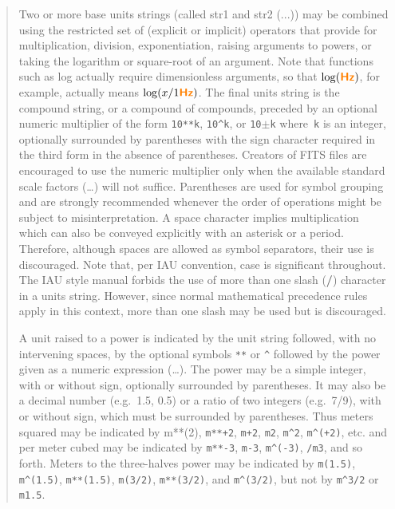 \documentclass[12pt,notitlepage,onecolumn]{ivoa}
\def\eg{e.g.~}
\newcommand{\unit}[1]{\textbf{\textsf{\color{orange}#1}}}
\begin{document}
\begin{quote}
Two or more base units strings (called str1 and str2 (...)) may be combined using
the restricted set of (explicit or implicit) operators that provide
for multiplication, division, exponentiation, raising arguments
to powers, or taking the logarithm or square-root of an
argument. Note that functions such as log actually require dimensionless
arguments, so that $\log(\unit{Hz})$, for example, actually
means $\log(x/1 \unit{Hz})$. The final units string is the compound
string, or a compound of compounds, preceded by an
optional numeric multiplier of the form \texttt{10**k}, \texttt{10\^{}k}, or \texttt{10$\pm$k}
where~\texttt k is an integer, optionally surrounded by parentheses with
the sign character required in the third form in the absence of 
parentheses. Creators of FITS files are encouraged to use the
numeric multiplier only when the available standard scale factors
(\dots) will not suffice. Parentheses are used for symbol
grouping and are strongly recommended whenever the order
of operations might be subject to misinterpretation. A space
character implies multiplication which can also be conveyed explicitly
with an asterisk or a period. Therefore, although spaces
are allowed as symbol separators, their use is discouraged. Note
that, per IAU convention, case is significant throughout. The IAU
style manual forbids the use of more than one slash (\unit{/}) character
in a units string. However, since normal mathematical precedence
rules apply in this context, more than one slash may be
used but is discouraged.

A unit raised to a power is indicated by the unit string followed,
with no intervening spaces, by the optional symbols \texttt{**}
or \texttt{\^{}} followed by the power given as a numeric expression (\dots). 
The power may be a simple integer, with or
without sign, optionally surrounded by parentheses. It may also
be a decimal number (\eg 1.5, 0.5) or a ratio of two integers
(\eg 7/9), with or without sign, which must be surrounded by
parentheses. Thus meters squared may be indicated by m**(2),
\texttt{m**+2}, \texttt{m+2}, \texttt{m2}, \texttt{m\^{}2}, \texttt{m\^{}(+2)}, etc. and per meter cubed may be
indicated by \texttt{m**-3}, \texttt{m-3}, \texttt{m\^{}(-3)}, \texttt{/m3}, and so forth. Meters to
the three-halves power may be indicated by \texttt{m(1.5)}, \texttt{m\^{}(1.5)},
\texttt{m**(1.5)}, \texttt{m(3/2)}, \texttt{m**(3/2)}, and \texttt{m\^{}(3/2)}, but not by \texttt{m\^{}3/2}
or \texttt{m1.5}.~\cite[\S4.3.1]{pence10}
\end{quote}
\end{document}
